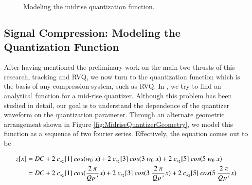 \documentclass[12pt,letterpaper,doublespaced,ETD,proposal]{gt-ece-thesis}
\begin{document}
\begin{Body}
		\begin{figure}	
		\centering
		\caption{Modeling the  midrise quantization function.}
		\label{fig:MidriseQuantizer} 	
		\end{figure}	
		
\subsection{Signal Compression: Modeling the Quantization Function}
After having mentioned the preliminary work on the main two thrusts of this research, tracking and RVQ, we now turn to the quantization function which is the basis of any compression system, such as RVQ.  In \cite{2010_CNF_Quant_Aslam}, we try to find an analytical function for a mid-rise quantizer.  Although this problem has been studied in detail, our goal is to understand the dependence of the quantizer waveform on the quantization parameter.  Through an alternate geometric arrangement shown in Figure \ref{fig:MidriseQuantizerGeometry}, we model this function as a sequence of two fourier series.  Effectively, the equation comes out to be


		\begin{align}
		z[x] &= DC + 2 \ c_{s_2}[1] \ cos( w_0 \ x) + 2 \ c_{s_2}[3] \ cos(3 \ w_0 \ x) + 2 \ c_{s_2}[5] \ cos(5 \ w_0 \ x)\notag\\
		 			 &= DC + 2 \ c_{s_2}[1] \ cos( \frac{2 \ \pi}{Qp\,^{\prime}}x) + 2 \ c_{s_2}[3] \ cos(3 \ \frac{2  \  \pi}{Qp\,^{\prime}}x) + 2 \ c_{s_2}[5] \ cos(5 \ \frac{2  \ \pi}{Qp\,^{\prime}}x)
		\label{eq:Square_2_time}
		\end{align}
			

\end{Body}
\end{document}
